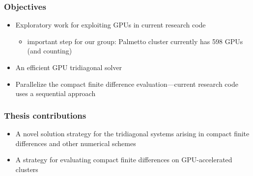 \begin{frame}
\frametitle{Objectives}
\begin{itemize}
    \item Exploratory work for exploiting GPUs
        in current research code
        \begin{itemize}
            \item important step for our group: Palmetto cluster
        currently has 598 GPUs (and counting)
        \end{itemize}
    \item An efficient GPU tridiagonal solver
    \item Parallelize the compact finite difference evaluation---current
        research code uses a sequential approach
\end{itemize}
\end{frame}

\begin{frame}
\frametitle{Thesis contributions}
\begin{itemize}
    \item A novel solution strategy for
        the tridiagonal systems arising in
        compact finite differences
        and other numerical schemes
    \item A strategy for evaluating compact
        finite differences on GPU-accelerated clusters
\end{itemize}
\end{frame}

